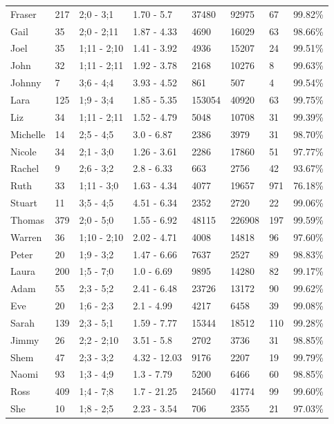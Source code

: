 \begin{table}[h]
\begin{tabular}{llllllll}
Fraser & 217 & 2;0 - 3;1 & 1.70 - 5.7 & 37480 & 92975 & 67 & 99.82\% \\
Gail & 35 & 2;0 - 2;11 & 1.87 - 4.33 & 4690 & 16029 & 63 & 98.66\% \\
Joel & 35 & 1;11 - 2;10 & 1.41 - 3.92 & 4936 & 15207 & 24 & 99.51\% \\
John & 32 & 1;11 - 2;11 & 1.92 - 3.78 & 2168 & 10276 & 8 & 99.63\% \\
Johnny & 7 & 3;6 - 4;4 & 3.93 - 4.52 & 861 & 507 & 4 & 99.54\% \\
Lara & 125 & 1;9 - 3;4 & 1.85 - 5.35 & 153054 & 40920 & 63 & 99.75\% \\
Liz & 34 & 1;11 - 2;11 & 1.52 - 4.79 & 5048 & 10708 & 31 & 99.39\% \\
Michelle & 14 & 2;5 - 4;5 & 3.0 - 6.87 & 2386 & 3979 & 31 & 98.70\% \\
Nicole & 34 & 2;1 - 3;0 & 1.26 - 3.61 & 2286 & 17860 & 51 & 97.77\% \\
Rachel & 9 & 2;6 - 3;2 & 2.8 - 6.33 & 663 & 2756 & 42 & 93.67\% \\
Ruth & 33 & 1;11 - 3;0 & 1.63 - 4.34 & 4077 & 19657 & 971 & 76.18\% \\
Stuart & 11 & 3;5 - 4;5 & 4.51 - 6.34 & 2352 & 2720 & 22 & 99.06\% \\
Thomas & 379 & 2;0 - 5;0 & 1.55 - 6.92 & 48115 & 226908 & 197 & 99.59\% \\
Warren & 36 & 1;10 - 2;10 & 2.02 - 4.71 & 4008 & 14818 & 96 & 97.60\% \\
Peter & 20 & 1;9 - 3;2 & 1.47 - 6.66 & 7637 & 2527 & 89 & 98.83\% \\
Laura & 200 & 1;5 - 7;0 & 1.0 - 6.69 & 9895 & 14280 & 82 & 99.17\% \\
Adam & 55 & 2;3 - 5;2 & 2.41 - 6.48 & 23726 & 13172 & 90 & 99.62\% \\
Eve & 20 & 1;6 - 2;3 & 2.1 - 4.99 & 4217 & 6458 & 39 & 99.08\% \\
Sarah & 139 & 2;3 - 5;1 & 1.59 - 7.77 & 15344 & 18512 & 110 & 99.28\% \\
Jimmy & 26 & 2;2 - 2;10 & 3.51 - 5.8 & 2702 & 3736 & 31 & 98.85\% \\
Shem & 47 & 2;3 - 3;2 & 4.32 - 12.03 & 9176 & 2207 & 19 & 99.79\% \\
Naomi & 93 & 1;3 - 4;9 & 1.3 - 7.79 & 5200 & 6466 & 60 & 98.85\% \\
Ross & 409 & 1;4 - 7;8 & 1.7 - 21.25 & 24560 & 41774 & 99 & 99.60\% \\
She & 10 & 1;8 - 2;5 & 2.23 - 3.54 & 706 & 2355 & 21 & 97.03\% \\

\end{tabular}
\end{table}
